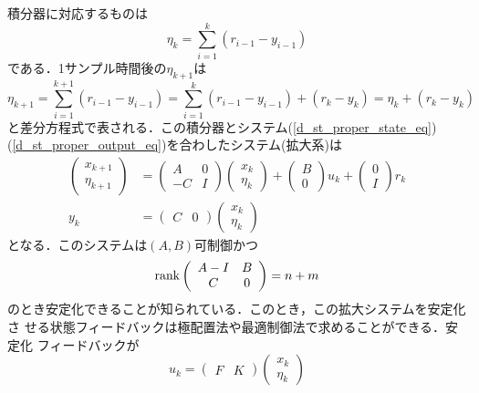 積分器に対応するものは
\begin{equation}
 \eta_{k} = \sum_{i=1}^{k} (r_{i-1}-y_{i-1}) 
\end{equation}
である．1サンプル時間後の$\eta_{k+1}$は
\begin{equation}
 \eta_{k+1} = \sum_{i=1}^{k+1} (r_{i-1}-y_{i-1}) 
   = \sum_{i=1}^{k} (r_{i-1}-y_{i-1}) + (r_k-y_k) = \eta_k + (r_k - y_k) 
\end{equation}
と差分方程式で表される．この積分器とシステム(\ref{d_st_proper_state_eq})
(\ref{d_st_proper_output_eq})を合わしたシステム(拡大系)は
\begin{align}
 \left(\begin{array}{c}
	x_{k+1} \\
	\eta_{k+1}
       \end{array}\right)
 &=
 \left(\begin{array}{cc}
        A  & 0 \\
	-C & I
       \end{array}\right)
 \left(\begin{array}{c}
        x_k \\
	\eta_k
       \end{array}\right)
 +
 \left(\begin{array}{c}
	B \\
	0
       \end{array}\right)
 u_k +
 \left(\begin{array}{c}
        0 \\
	I
       \end{array}\right) 
 r_k \\
 y_k &=
  \left(\begin{array}{cc}
         C & 0 
	\end{array}\right)
  \left(\begin{array}{c}
         x_k \\
	 \eta_k
	\end{array}\right)
\end{align}
となる．このシステムは$(A, B)$可制御かつ
\begin{equation}
 \mathop{\rm rank}\nolimits \left(\begin{array}{cc}
	      A - I  & B \\
	      C      & 0
	     \end{array}\right)
 = n + m
\end{equation}
のとき安定化できることが知られている．このとき，この拡大システムを安定化さ
せる状態フィードバックは極配置法や最適制御法で求めることができる．安定化
フィードバックが
\begin{equation}
 u_k = \left(\begin{array}{cc}
	      F & K 
	     \end{array}\right)
 \left(\begin{array}{c}
        x_k \\
	\eta_k
       \end{array}\right)
\end{equation}
